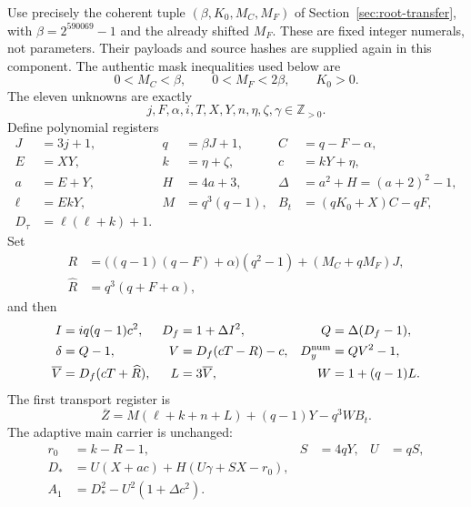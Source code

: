Use precisely the coherent tuple $(\beta,K_0,M_C,M_F)$ of
Section~\ref{sec:root-transfer}, with $\beta=2^{590069}-1$ and the already
shifted $M_F$. These are fixed integer numerals, not parameters.
Their payloads and source hashes are supplied again in this component.
The authentic mask inequalities used below are
\[
 0<M_C<\beta,\qquad 0<M_F<2\beta,\qquad K_0>0.
\]
The eleven unknowns are exactly
\[
 j,F,\alpha,i,T,X,Y,n,\eta,\zeta,\gamma\in\mathbb Z_{>0}.
\]
Define polynomial registers
\begin{align*}
 J&=3j+1,&q&=\beta J+1,&C&=q-F-\alpha,\\
 E&=XY,&k&=\eta+\zeta,&c&=kY+\eta,\\
 a&=E+Y,&H&=4a+3,&\Delta&=a^2+H=(a+2)^2-1,\\
 \ell&=EkY,&M&=q^3(q-1),&B_t&=(qK_0+X)C-qF,\\
 D_\tau&=\ell(\ell+k)+1.&&&
\end{align*}
Set
\begin{align}
 R&=\bigl((q-1)(q-F)+\alpha\bigr)(q^2-1)+(M_C+qM_F)J,
       \label{rt11:R}\\
 \widehat R&=q^3(q+F+\alpha),\nonumber
\end{align}
and then
\begin{align}
 I&=iq(q-1)c^2,&D_f&=1+\Delta I^2,&Q&=\Delta(D_f-1),
       \label{rt11:strong}\\
 \delta&=Q-1,&V&=D_f(cT-R)-c,&D_y^{\rm num}&=QV^2-1,
       \nonumber\\
 \overline V&=D_f(cT+\widehat R),&L&=3\overline V,&W&=1+(q-1)L.
       \label{rt11:majorant}
\end{align}
The first transport register is
\begin{equation}
 \overline Z=M(\ell+k+n+L)+(q-1)Y-q^3WB_t.
 \label{rt11:Z}
\end{equation}
The adaptive main carrier is unchanged:
\begin{align}
 r_0&=k-R-1,& S&=4qY,& U&=qS,\nonumber\\
 D_*&=U(X+ac)+H(U\gamma+SX-r_0),\nonumber\\
 A_1&=D_*^2-U^2(1+\Delta c^2).
 \label{rt11:main}
\end{align}


